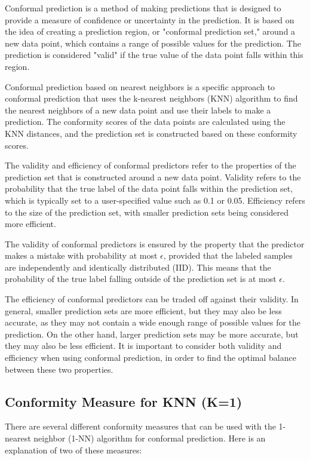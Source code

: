 Conformal prediction is a method of making predictions that is designed to provide a measure of confidence or uncertainty in the prediction. It is based on the idea of creating a prediction region, or "conformal prediction set," around a new data point, which contains a range of possible values for the prediction. The prediction is considered "valid" if the true value of the data point falls within this region.

Conformal prediction based on nearest neighbors is a specific approach to conformal prediction that uses the k-nearest neighbors (KNN) algorithm to find the nearest neighbors of a new data point and use their labels to make a prediction. The conformity scores of the data points are calculated using the KNN distances, and the prediction set is constructed based on these conformity scores.

The validity and efficiency of conformal predictors refer to the properties of the prediction set that is constructed around a new data point. Validity refers to the probability that the true label of the data point falls within the prediction set, which is typically set to a user-specified value such as 0.1 or 0.05. Efficiency refers to the size of the prediction set, with smaller prediction sets being considered more efficient.

The validity of conformal predictors is ensured by the property that the predictor makes a mistake with probability at most $\epsilon$, provided that the labeled samples are independently and identically distributed (IID). This means that the probability of the true label falling outside of the prediction set is at most $\epsilon$.

The efficiency of conformal predictors can be traded off against their validity. In general, smaller prediction sets are more efficient, but they may also be less accurate, as they may not contain a wide enough range of possible values for the prediction. On the other hand, larger prediction sets may be more accurate, but they may also be less efficient. It is important to consider both validity and efficiency when using conformal prediction, in order to find the optimal balance between these two properties.


\subsection{Conformity Measure for KNN (K=1)}
There are several different conformity measures that can be used with the 1-nearest neighbor (1-NN) algorithm for conformal prediction. Here is an explanation of two of these measures:

